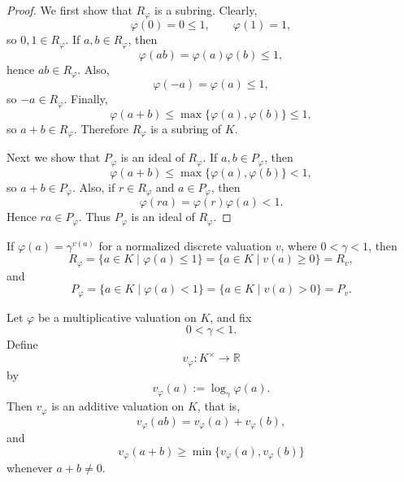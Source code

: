 \begin{proof}
    We first show that \(R_\varphi\) is a subring. Clearly,
    \[
        \varphi(0)=0\leq 1,
        \qquad
        \varphi(1)=1,
    \]
    so \(0,1\in R_\varphi\). If \(a,b\in R_\varphi\), then
    \[
        \varphi(ab)=\varphi(a)\varphi(b)\leq 1,
    \]
    hence \(ab\in R_\varphi\). Also,
    \[
        \varphi(-a)=\varphi(a)\leq 1,
    \]
    so \(-a\in R_\varphi\). Finally,
    \[
        \varphi(a+b)\leq \max\{\varphi(a),\varphi(b)\}\leq 1,
    \]
    so \(a+b\in R_\varphi\). Therefore \(R_\varphi\) is a subring of \(K\).

    Next we show that \(P_\varphi\) is an ideal of \(R_\varphi\). If \(a,b\in P_\varphi\),
    then
    \[
        \varphi(a+b)\leq \max\{\varphi(a),\varphi(b)\}<1,
    \]
    so \(a+b\in P_\varphi\). Also, if \(r\in R_\varphi\) and \(a\in P_\varphi\), then
    \[
        \varphi(ra)=\varphi(r)\varphi(a)<1.
    \]
    Hence \(ra\in P_\varphi\). Thus \(P_\varphi\) is an ideal of \(R_\varphi\).
\end{proof}

\begin{remark}
    If \(\varphi(a)=\gamma^{v(a)}\) for a normalized discrete valuation \(v\), where
    \(0<\gamma<1\), then
    \[
        R_\varphi
        =
        \{a\in K\mid \varphi(a)\leq 1\}
        =
        \{a\in K\mid v(a)\geq 0\}
        =
        R_v,
    \]
    and
    \[
        P_\varphi
        =
        \{a\in K\mid \varphi(a)<1\}
        =
        \{a\in K\mid v(a)>0\}
        =
        P_v.
    \]
\end{remark}

\begin{proposition}
    Let \(\varphi\) be a multiplicative valuation on \(K\), and fix
    \[
        0<\gamma<1.
    \]
    Define
    \[
        v_\varphi:K^\times\longrightarrow \mathbb{R}
    \]
    by
    \[
        v_\varphi(a):=\log_\gamma \varphi(a).
    \]
    Then \(v_\varphi\) is an additive valuation on \(K\), that is,
    \[
        v_\varphi(ab)=v_\varphi(a)+v_\varphi(b),
    \]
    and
    \[
        v_\varphi(a+b)\geq \min\{v_\varphi(a),v_\varphi(b)\}
    \]
    whenever \(a+b\neq 0\).
\end{proposition}

